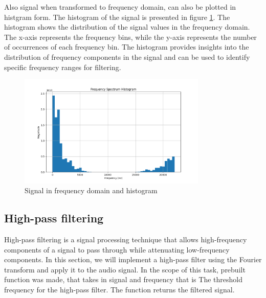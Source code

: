 \documentclass[a4paper,12pt,fleqn]{article}
\begin{document}
Also signal when transformed to frequency domain, can also be plotted in histgram form. 
The histogram of the signal is presented in figure \ref{fig:histogram}. The 
histogram shows the distribution of the signal values in the frequency domain. 
The x-axis represents the frequency bins, while the y-axis represents the number of
 occurrences of each frequency bin. The histogram provides insights into the distribution
  of frequency components in the signal and can be used to identify specific frequency 
  ranges for filtering.
  \begin{figure}[H]
    \centering
    \includegraphics[width=0.8\textwidth]{original_spectrum_histogram.png}
    \caption{Signal in frequency domain and histogram}
    \label{fig:histogram}
\end{figure}
\subsection{High-pass filtering}

\hspace{1 em} High-pass filtering is a signal processing technique that allows high-frequency components of a signal to pass through while attenuating low-frequency components. In this section, we will implement a high-pass filter using the Fourier transform and apply it to the audio signal.
In the scope of this task, prebuilt function was made, that takes in signal and frequency that is The
threshold frequency for the high-pass filter. The function returns the filtered signal.
\end{document}
